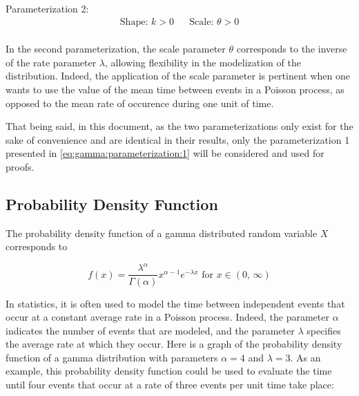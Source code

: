 \documentclass[12pt]{article}
\begin{document}
\noindent Parameterization 2:\vspace*{-24pt}
\begin{align}\label{eq:gamma:parameterization:2}
	\text{Shape: } k>0			&&	\text{Scale: }\theta>0
\end{align}\\[-60pt]

In the second parameterization, the scale parameter $\theta$ corresponds to the inverse of the rate parameter $\lambda$,
allowing flexibility in the modelization of the distribution. Indeed, the application of the scale parameter is
pertinent when one wants to use the value of the mean time between events in a Poisson process, as
opposed to the mean rate of occurence during one unit of time.

That being said, in this document, as the two parameterizations only exist for the sake of convenience and are identical
in their results, only the parameterization 1 presented in \autoref{eq:gamma:parameterization:1} will be considered and
used for proofs.


\pagebreak
\subsection{Probability Density Function}\label{subsec:gamma:pdf}
The probability density function of a gamma distributed random variable $X$ corresponds to

\begin{equation}\label{eq:gamma:pdf}
	f(x) = \frac{\lambda^\alpha}{\Gamma(\alpha)}x^{\alpha-1}e^{-\lambda x}\text{ for }x\in (0,\,\infty)
\end{equation}

In statistics, it is often used to model the time between independent events that occur at a constant average rate in a
Poisson process. Indeed, the parameter $\alpha$ indicates the number of events that are modeled, and the parameter
$\lambda$ specifies the average rate at which they occur. Here is a graph of the probability density function of a gamma
distribution with parameters $\alpha=4$ and $\lambda=3$. As an example, this probability density function could be used
to evaluate the time until four events that occur at a rate of three events per unit time take place:
\end{document}
